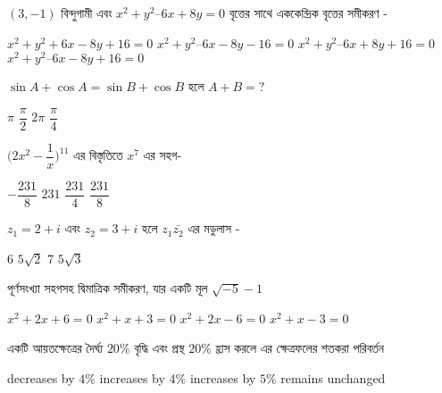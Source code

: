 \documentclass[addpoints]{exam}
\begin{document}
\begin{questions}
\begin{oneparchoices}
\end{oneparchoices}

\question   $(3, -1)$ বিন্দুগামী এবং  $x^2 + y^2 – 6x + 8y = 0$ বৃত্তের সাথে এককেন্দ্রিক বৃত্তের সমীকরণ  -

\begin{oneparchoices}
\choice $x^2 + y^2 + 6x - 8y +16 = 0$
\choice $x^2 + y^2 – 6x - 8y -16= 0$
\choice $x^2 + y^2 – 6x + 8y +16 = 0$
\choice $x^2 + y^2 – 6x -8y + 16 = 0$

\end{oneparchoices}

\question  $ \sin A + \cos A = \sin B + \cos B $ হলে $ A+B =? $

\begin{oneparchoices}
\choice  $\pi$
\choice  $\dfrac{\pi}{2}$
\choice  $2\pi$
\choice  $\dfrac{\pi}{4}$
\end{oneparchoices}

\question  $ \Big(2x^2 - \dfrac{1}{x} \Big)^{11} $ এর বিস্তৃতিতে $ x^7 $ এর সহগ-

\begin{oneparchoices}
\choice $ - \dfrac{231}{8} $
\choice $ 231 $
\choice $  \dfrac{231}{4} $
\choice  $  \dfrac{231}{8} $

\end{oneparchoices}

\question  $ z_{1}= 2+i $ এবং $ z_{2} = 3+i $ হলে $ z_{1}\bar{z_{2}} $ এর মডুলাস -

\begin{oneparchoices}
\choice $ 6 $
\choice $ 5\sqrt{2} $
\choice $ 7 $
\choice $ 5\sqrt{3} $

\end{oneparchoices}

\question  পূর্ণসংখ্যা সহগসহ দ্বিমাত্রিক সমীকরণ, যার একটি মূল $ \sqrt{-5}-1 $

\begin{oneparchoices}
\choice $ x^2 + 2x + 6 = 0 $
\choice $  x^2 + x + 3 = 0 $
\choice $ x^2 + 2x - 6 = 0 $
\choice $ x^2 + x - 3 = 0 $

\end{oneparchoices}


\question   একটি আয়তক্ষেত্রের দৈর্ঘ্য $20\%$ বৃদ্ধি এবং প্রস্থ $20\%$ হ্রাস করলে এর ক্ষেত্রফলের শতকরা পরিবর্তন

\begin{oneparchoices}
\choice  decreases by $4\% $
\choice   increases by $4\% $
\choice  increases by $5\% $
\choice remains unchanged

\end{oneparchoices}


\end{questions}
\end{document}
